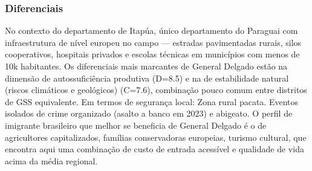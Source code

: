 \subsubsection*{Diferenciais}\label{dif-general-delgado-0713}
No contexto do departamento de Itapúa, único departamento do Paraguai com infraestrutura de nível europeu no campo — estradas pavimentadas rurais, silos cooperativos, hospitais privados e escolas técnicas em municípios com menos de 10k habitantes. Os diferenciais mais marcantes de General Delgado estão na dimensão de autossuficiência produtiva (D=8.5) e na de estabilidade natural (riscos climáticos e geológicos) (C=7.6), combinação pouco comum entre distritos de GSS equivalente. Em termos de segurança local: Zona rural pacata. Eventos isolados de crime organizado (asalto a banco em 2023) e abigeato. O perfil de imigrante brasileiro que melhor se beneficia de General Delgado é o de agricultores capitalizados, famílias conservadoras europeias, turismo cultural, que encontra aqui uma combinação de custo de entrada acessível e qualidade de vida acima da média regional.
